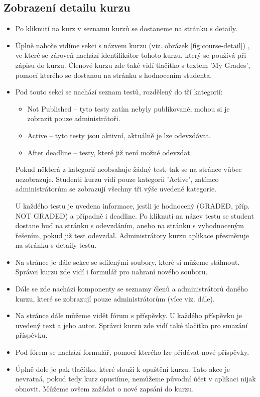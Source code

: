 \subsection{Zobrazení detailu kurzu}

\begin{itemize}
	\item Po kliknutí na kurz v seznamu kurzů se dostaneme na stránku s detaily.
	\item Úplně nahoře vidíme sekci s názvem kurzu (viz. obrázek \ref{fig:course-detail}) , ve které se zároveň nachází identifikátor tohoto kurzu, který se používá při zápisu do kurzu. Členové kurzu zde také vidí tlačítko s textem 'My Grades', pomocí kterého se dostanou na stránku s hodnocením studenta.
	\item Pod touto sekcí se nachází seznam testů, rozdělený do tří kategorií:
		\begin{itemize}
			\item Not Published -- tyto testy zatím nebyly publikované, mohou si je zobrazit pouze administrátoři.
			\item Active -- tyto testy jsou aktivní, aktuálně je lze odevzdávat.
			\item After deadline -- testy, které již není možné odevzdat.
		\end{itemize}
		Pokud některá z kategorií neobsahuje žádný test, tak se na stránce vůbec nezobrazuje. Studenti kurzu vidí pouze kategorii 'Active', zatímco administrátorům se zobrazují všechny tři výše uvedené kategorie.
		
		U každého testu je uvedena informace, jestli je hodnocený (GRADED, příp. NOT GRADED) a případně i deadline.
		Po kliknutí na název testu se student dostane buď na stránku s odevzdáním, anebo na stránku s vyhodnoceným řešením, pokud již test odevzdal. Administrátory kurzu aplikace přesměruje na stránku s detaily testu.
		
	\item Na stránce je dále sekce se sdílenými soubory, které si můžeme stáhnout. Správci kurzu zde vidí i formulář pro nahraní nového souboru.
	\item Dále se zde nachází komponenty se seznamy členů a administrátorů daného kurzu, které se zobrazují pouze administrátorům (více viz. dále).
	\item Na stránce dále můžeme vidět fórum s příspěvky. U každého příspěvku je uvedený text a jeho autor. Správci kurzu zde vidí také tlačítko pro smazání příspěvku.
	\item Pod fórem se nachází formulář, pomocí kterého lze přidávat nové příspěvky.
	\item Úplně dole je pak tlačítko, které slouží k opuštění kurzu. Tato akce je nevratná, pokud tedy kurz opustíme, nemůžeme původní účet v aplikaci nijak obnovit. Můžeme ovšem zažádat o nové zapsání do kurzu.
\end{itemize}

